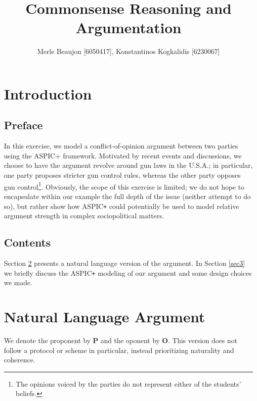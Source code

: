 \documentclass[]{article}
\begin{document}
\author{Merle Beaujon [6050417], Konstantinos Kogkalidis [6230067]}
\title{Commonsense Reasoning and Argumentation}
\maketitle
\section{Introduction}
\subsection{Preface}
In this exercise, we model a conflict-of-opinion argument between two parties using the ASPIC+ framework. Motivated by recent events and discussions, we choose to have the argument revolve around gun laws in the U.S.A.; in particular, one party proposes stricter gun control rules, whereas the other party opposes gun control\footnote{The opinions voiced by the parties do not represent either of the students' beliefs.}. Obviously, the scope of this exercise is limited; we do not hope to encapsulate within our example the full depth of the issue (neither attempt to do so), but rather show how ASPIC\texttt{+} could potentially be used to model relative argument strength in complex sociopolitical matters.
\subsection{Contents}
Section \ref{sec2} presents a natural language version of the argument. In Section \ref{sec3} we briefly discuss the ASPIC\texttt{+} modeling of our argument and some design choices we made. 

\section{Natural Language Argument}\label{sec2}
We denote the proponent by \textbf{P} and the oponent by \textbf{O}. This version does not follow a protocol or scheme in particular, instead prioritizing naturality and coherence.
\end{document}
